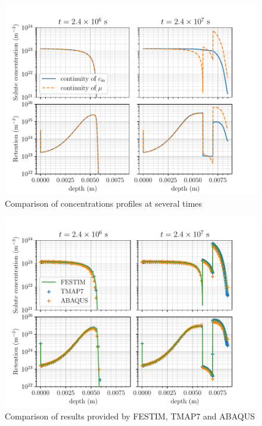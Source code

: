 \begin{figure}
    \centering
    \includegraphics[width=\linewidth]{Figures/Chapter3/monoblocks/interface_condition/iter case/comparison_profiles.pdf}
    \caption{Comparison of concentrations profiles at several times}
    \label{fig: concentrations profiles 1D}
\end{figure}

\begin{figure}
    \centering
    \includegraphics[width=\linewidth]{Figures/Chapter3/monoblocks/interface_condition/iter case/comparison_codes.pdf}
    \caption{Comparison of results provided by FESTIM, TMAP7 and ABAQUS}
    \label{fig: code comparison}
\end{figure}

